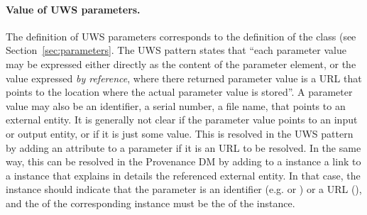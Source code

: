\paragraph{Value of UWS parameters.}
The definition of UWS parameters corresponds to the definition of the  class (see Section~\ref{sec:parameters}. 
The UWS pattern states that ``each parameter value may be expressed either directly as the content of the parameter element, or the value expressed \emph{by reference}, where there returned parameter value is a URL that points to the location where the actual parameter value is stored''.
A parameter value may also be an identifier, a serial number, a file name, that points to an external entity. 
It is generally not clear if the parameter value points to an input or output entity, or if it is just some value. 
This is resolved in the UWS pattern \citep{std:UWS} by adding an attribute  to a parameter if it is an URL to be resolved.
In the same way, this can be resolved in the Provenance DM by adding to a  instance a link to a  instance that explains in details the referenced external entity.
In that case, the  instance should indicate that the parameter is an identifier (e.g.  or ) or a URL (), and the  of the corresponding  instance must be the  of the  instance.



